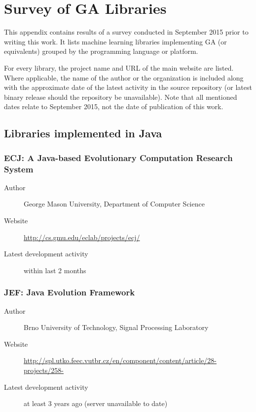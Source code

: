 \chapter{Survey of GA Libraries}\label{appendix:survey}

This appendix contains results of a survey conducted in September 2015 prior to writing this work. It lists machine learning libraries implementing GA (or equivalents) grouped by the programming language or platform.

For every library, the project name and URL of the main website are listed. Where applicable, the name of the author or the organization is included along with the approximate date of the latest activity in the source repository (or latest binary release should the repository be unavailable). Note that all mentioned dates relate to September 2015, not the date of publication of this work.

\section{Libraries implemented in Java}

\subsection*{ECJ: A Java-based Evolutionary Computation Research System}
\begin{description}
    \item[Author] George Mason University, Department of Computer Science
    \item[Website] \url{http://cs.gmu.edu/eclab/projects/ecj/}
    \item[Latest development activity] within last 2 months
\end{description}


\subsection*{JEF: Java Evolution Framework}
\begin{description}
    \item[Author] Brno University of Technology, Signal Processing Laboratory
    \item[Website] \url{http://spl.utko.feec.vutbr.cz/en/component/content/article/28-projects/258-}
    \item[Latest development activity] at least 3 years ago (server unavailable to date)
\end{description}


